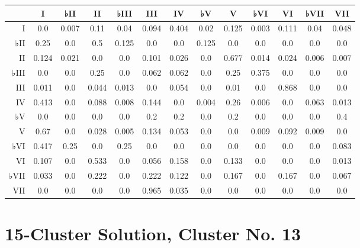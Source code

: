 \begin{table}[htbp]
\begin{minipage}{\linewidth}
\setlength{\tymax}{0.5\linewidth}
\centering
\small
\begin{tabulary}{\textwidth}{@{}RCCCCCCCCCCCC@{}} \toprule
&I&♭II&II&♭III&III&IV&♭V&V&♭VI&VI&♭VII&VII\\
\midrule
I&0.0&0.007&0.11&0.04&0.094&0.404&0.02&0.125&0.003&0.111&0.04&0.048\\
♭II&0.25&0.0&0.5&0.125&0.0&0.0&0.125&0.0&0.0&0.0&0.0&0.0\\
II&0.124&0.021&0.0&0.0&0.101&0.026&0.0&0.677&0.014&0.024&0.006&0.007\\
♭III&0.0&0.0&0.25&0.0&0.062&0.062&0.0&0.25&0.375&0.0&0.0&0.0\\
III&0.011&0.0&0.044&0.013&0.0&0.054&0.0&0.01&0.0&0.868&0.0&0.0\\
IV&0.413&0.0&0.088&0.008&0.144&0.0&0.004&0.26&0.006&0.0&0.063&0.013\\
♭V&0.0&0.0&0.0&0.0&0.2&0.2&0.0&0.2&0.0&0.0&0.0&0.4\\
V&0.67&0.0&0.028&0.005&0.134&0.053&0.0&0.0&0.009&0.092&0.009&0.0\\
♭VI&0.417&0.25&0.0&0.25&0.0&0.0&0.0&0.0&0.0&0.0&0.0&0.083\\
VI&0.107&0.0&0.533&0.0&0.056&0.158&0.0&0.133&0.0&0.0&0.0&0.013\\
♭VII&0.033&0.0&0.222&0.0&0.222&0.122&0.0&0.167&0.0&0.167&0.0&0.067\\
VII&0.0&0.0&0.0&0.0&0.965&0.035&0.0&0.0&0.0&0.0&0.0&0.0\\

\bottomrule

\end{tabulary}
\end{minipage}
\end{table}

\section{15-Cluster Solution, Cluster No. 13}
\label{15-clustersolutionclusterno.13}

